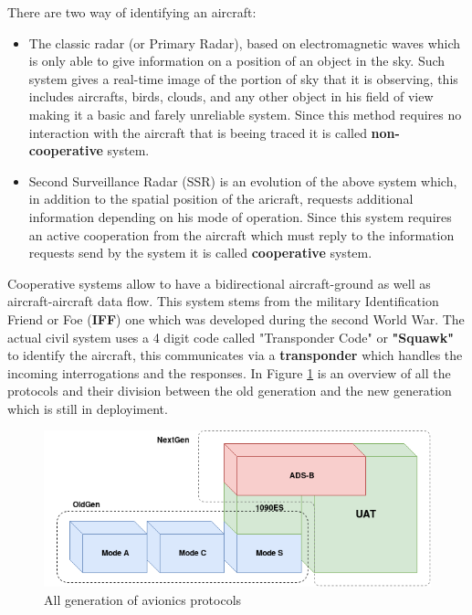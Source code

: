 \documentclass[../main.tex]{subfiles}
\begin{document}
There are two way of identifying an aircraft:
\begin{itemize}
  \item The classic radar (or Primary Radar), based on electromagnetic waves which is only able to give information on a position of an object in the sky. Such system gives a real-time image of the portion of sky that it is observing, this includes aircrafts, birds, clouds, and any other object in his field of view making it a basic and farely unreliable system. Since this method requires no interaction with the aircraft that is beeing traced it is called \textbf{non-cooperative} system.
  \item Second Surveillance Radar (SSR) is an evolution of the above system which, in addition to the spatial position of the aricraft, requests additional information depending on his mode of operation. Since this system requires an active cooperation from the aircraft which must reply to the information requests send by the system it is called \textbf{cooperative} system.
\end{itemize}

Cooperative systems allow to have a bidirectional aircraft-ground as well as aircraft-aircraft data flow. This system stems from the military Identification Friend or Foe (\textbf{IFF}) one which was developed during the second World War. The actual civil system uses a 4 digit code called "Transponder Code" or \textbf{"Squawk"} to identify the aircraft, this communicates via a \textbf{transponder} which handles the incoming interrogations and the responses. In Figure \ref{fig:allgen} is an overview of all the protocols and their division between the old generation and the new generation which is still in deployiment.

\begin{figure}[htp]
  \centering
  \includegraphics[scale=0.6]{images/allgen.png}
  \caption{All generation of avionics protocols}
  \label{fig:allgen}
\end{figure}
\end{document}
